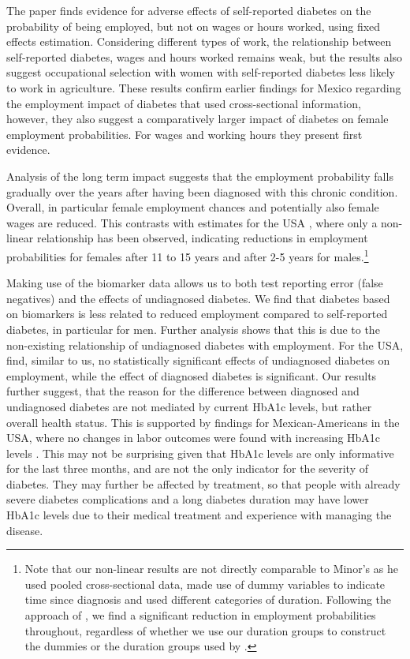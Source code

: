 \documentclass[12pt,english]{article}
\begin{document}
The paper finds evidence for adverse effects of self-reported diabetes on the probability of being employed, but not on wages or hours worked, using fixed effects estimation. Considering different types of work, the relationship between self-reported diabetes, wages
and hours worked remains weak, but the results also suggest occupational selection with women with self-reported diabetes less likely to work in agriculture. These results confirm earlier findings for Mexico regarding the employment impact of diabetes that used cross-sectional information, however, they also suggest a comparatively larger impact of diabetes on female employment probabilities. For wages and working hours they present first evidence.

Analysis of the long term impact suggests that the employment probability falls gradually over the years after having been diagnosed with this chronic condition. Overall, in particular female employment chances and potentially also female wages are reduced. This contrasts with estimates for the USA \parencite{Minor2013}, where only a non-linear relationship has been observed, indicating reductions in employment probabilities for females after 11 to 15 years and after 2-5 years for males.\footnote{Note that our non-linear results are not directly comparable to Minor's as he used pooled cross-sectional data, made use of dummy variables to indicate time since diagnosis and used different categories of duration. Following the approach of \textcite{Minor2013}, we find a significant reduction in employment probabilities throughout, regardless of whether we use our duration groups to construct the dummies or the duration groups used by \textcite{Minor2013}.} 

Making use of the biomarker data allows us to both test reporting error (false negatives) and the effects of undiagnosed diabetes. We find that diabetes based on biomarkers is less related to reduced employment compared to self-reported diabetes, in particular for men. Further analysis shows that this is due to the non-existing relationship of undiagnosed diabetes with employment. For the USA, \textcite{Minor2015} find, similar to us, no statistically significant effects of undiagnosed diabetes on employment, while the effect of diagnosed diabetes is significant. Our results further suggest, that the reason for the difference between diagnosed and undiagnosed diabetes are not mediated by current \ac{HbA1c} levels, but rather overall health status. This is supported by findings for Mexican-Americans in the USA, where no changes in labor outcomes were found with increasing \ac{HbA1c} levels \parencite{BrownIII2011}. This may not be surprising given that \ac{HbA1c} levels are only informative for the last three months, and are not the only indicator for the severity of diabetes. They may further be affected by treatment, so that people with already severe diabetes complications and a long diabetes duration may have lower \ac{HbA1c} levels due to their medical treatment and experience with managing the disease.
\end{document}
